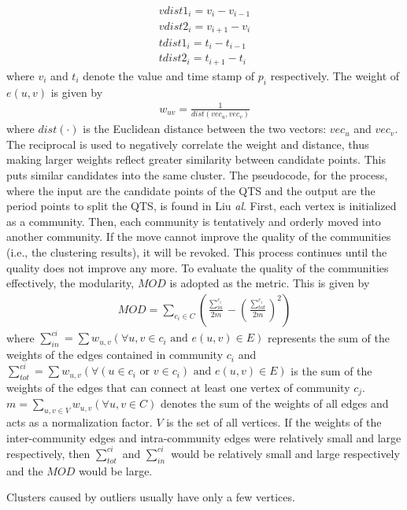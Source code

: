 \documentclass[twoside,twocolumn]{article}
\begin{document}
\begin{eqnarray}
	vdist1_i=v_i-v_{i-1}	\nonumber \\
	vdist2_i=v_{i+1}-v_i	\nonumber \\
	tdist1_i=t_i-t_{i-1}	\nonumber \\
	tdist2_i=t_{i+1}-t_i
\label{vdisttdist}
\end{eqnarray}
where $v_i$ and $t_i$ denote the value and time stamp of $p_i$ respectively.  The weight of $e(u,v)$ is given by 
\begin{eqnarray}
	w_{uv}=\frac{1}{dist(vec_u,vec_v)}
	\label{weightUV}
\end{eqnarray}
where $dist(\cdot)$ is the Euclidean distance between the two vectors: $vec_u$ and $vec_v$. The reciprocal is used to negatively correlate the weight and distance, thus making larger weights reflect greater similarity between candidate points.  This puts similar candidates into the same cluster.  The pseudocode, for the process, where the input are the candidate points of the QTS and the output are the period points to split the QTS, is found in Liu {\em al}\cite{Liu2022}.  First, each vertex is initialized as a community. Then, each community is tentatively and orderly moved into another community. If the move cannot improve the quality of the communities (i.e., the clustering results), it will be revoked. This process continues until the quality does not improve any more.  To evaluate the quality of the communities effectively, the modularity, $MOD$ is adopted as the metric.  This is given by
\begin{eqnarray}
	MOD=\sum_{c_i\in C}\left(\frac{\sum_{in}^{c_i}}{2m}-
	\left(\frac{\sum_{tot}^{c_i}}{2m}\right)^2
	\right)
	\label{MOD}
\end{eqnarray}
where $\sum_{in}^{ci}=\sum w_{u,v} (\forall u,v\in c_i  \text{ and } e(u,v) \in E)$ represents the sum of the weights of the edges contained in community $c_i$ and $\sum_{tot}^{ci}=\sum w_{u,v} (\forall (u\in c_i \text{ or } v \in c_i) \text{ and } e(u,v) \in E)$ is the sum of the weights of the edges that can connect at least one vertex of community $c_j$.  $m=\sum_{u,v\in V}w_{u,v}(\forall u,v\in C)$ denotes the sum of the weights of all edges and acts as a normalization factor.  $V$ is the set of all vertices.  If the weights of the inter-community edges and intra-community edges were relatively small and large respectively, then $\sum_{tot}^{ci}$ and $\sum_{in}^{ci}$ would be relatively small and large respectively  and the $MOD$ would be large.

Clusters caused by outliers usually have only a few vertices.
\end{document}
